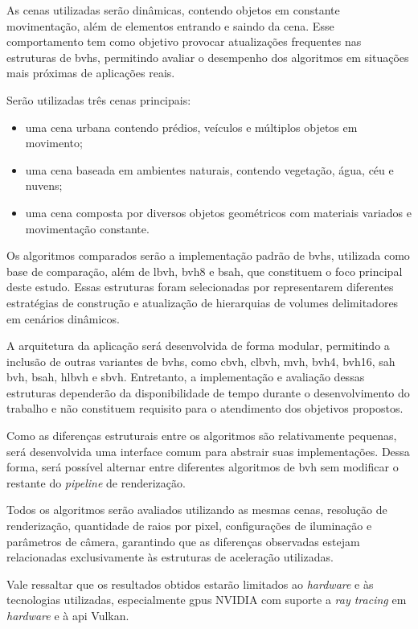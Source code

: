 As cenas utilizadas serão dinâmicas, contendo objetos em constante movimentação, além de elementos entrando e saindo da cena. Esse comportamento tem como objetivo provocar atualizações frequentes nas estruturas de \glspl{bvh}, permitindo avaliar o desempenho dos algoritmos em situações mais próximas de aplicações reais.

Serão utilizadas três cenas principais:
\begin{itemize}
    \item uma cena urbana contendo prédios, veículos e múltiplos objetos em movimento;
    \item uma cena baseada em ambientes naturais, contendo vegetação, água, céu e nuvens;
    \item uma cena composta por diversos objetos geométricos com materiais variados e movimentação constante.
\end{itemize}

Os algoritmos comparados serão a implementação padrão de \glspl{bvh}, utilizada como base de comparação, além de \gls{lbvh}, \gls{bvh8} e \gls{bsah}, que constituem o foco principal deste estudo. Essas estruturas foram selecionadas por representarem diferentes estratégias de construção e atualização de hierarquias de volumes delimitadores em cenários dinâmicos.

A arquitetura da aplicação será desenvolvida de forma modular, permitindo a inclusão de outras variantes de \glspl{bvh}, como \gls{cbvh}, \gls{clbvh}, \gls{mvh}, \gls{bvh4}, \gls{bvh16}, \gls{sah} \gls{bvh}, \gls{bsah}, \gls{hlbvh} e \gls{sbvh}. Entretanto, a implementação e avaliação dessas estruturas dependerão da disponibilidade de tempo durante o desenvolvimento do trabalho e não constituem requisito para o atendimento dos objetivos propostos.

Como as diferenças estruturais entre os algoritmos são relativamente pequenas, será desenvolvida uma interface comum para abstrair suas implementações. Dessa forma, será possível alternar entre diferentes algoritmos de \gls{bvh} sem modificar o restante do \textit{pipeline} de renderização.

Todos os algoritmos serão avaliados utilizando as mesmas cenas, resolução de renderização, quantidade de raios por pixel, configurações de iluminação e parâmetros de câmera, garantindo que as diferenças observadas estejam relacionadas exclusivamente às estruturas de aceleração utilizadas.

Vale ressaltar que os resultados obtidos estarão limitados ao \textit{hardware} e às tecnologias utilizadas, especialmente \glspl{gpu} NVIDIA com suporte a \textit{ray tracing} em \textit{hardware} e à \gls{api} Vulkan.

